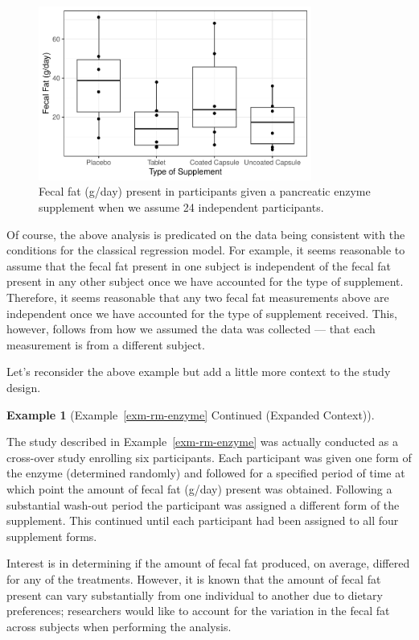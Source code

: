 \documentclass[
  letterpaper,
  DIV=11,
  numbers=noendperiod]{scrreprt}
\theoremstyle{definition}
\theoremstyle{definition}
\newtheorem{example}{Example}[chapter]
\theoremstyle{remark}
\begin{document}
\begin{figure}

{\centering \includegraphics[width=0.8\textwidth,height=\textheight]{./images/fig-rm-terminology-enzyme-plot-1.pdf}

}

\caption{\label{fig-rm-terminology-enzyme-plot}Fecal fat (g/day) present
in participants given a pancreatic enzyme supplement when we assume 24
independent participants.}

\end{figure}

Of course, the above analysis is predicated on the data being consistent
with the conditions for the classical regression model. For example, it
seems reasonable to assume that the fecal fat present in one subject is
independent of the fecal fat present in any other subject once we have
accounted for the type of supplement. Therefore, it seems reasonable
that any two fecal fat measurements above are independent once we have
accounted for the type of supplement received. This, however, follows
from how we assumed the data was collected --- that each measurement is
from a different subject.

Let's reconsider the above example but add a little more context to the
study design.

\begin{example}[Example~\ref{exm-rm-enzyme} Continued (Expanded
Context)]\protect\hypertarget{exm-rm-enzyme-expanded}{}\label{exm-rm-enzyme-expanded}

The study described in Example~\ref{exm-rm-enzyme} was actually
conducted as a cross-over study enrolling six participants. Each
participant was given one form of the enzyme (determined randomly) and
followed for a specified period of time at which point the amount of
fecal fat (g/day) present was obtained. Following a substantial wash-out
period the participant was assigned a different form of the supplement.
This continued until each participant had been assigned to all four
supplement forms.

Interest is in determining if the amount of fecal fat produced, on
average, differed for any of the treatments. However, it is known that
the amount of fecal fat present can vary substantially from one
individual to another due to dietary preferences; researchers would like
to account for the variation in the fecal fat across subjects when
performing the analysis.

\end{example}
\end{document}
